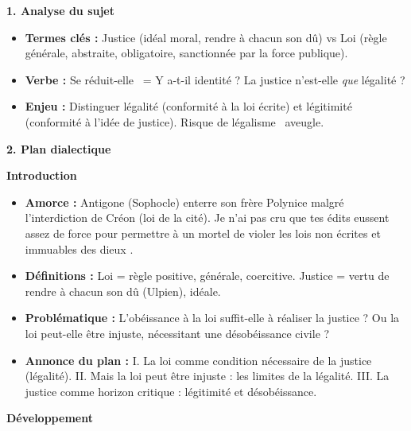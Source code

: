 \documentclass[11pt]{article}
\newcommand{\cle}[1]{{\popxbold\color{popdark}#1}}
\begin{document}
\begin{exoresolu}
\textbf{1. Analyse du sujet}
\begin{itemize}
    \item \textbf{Termes clés :} \cle{Justice} (idéal moral, rendre à chacun son dû) vs \cle{Loi} (règle générale, abstraite, obligatoire, sanctionnée par la force publique).
    \item \textbf{Verbe :} \guillemotleft Se réduit-elle \guillemotright\ = Y a-t-il identité ? La justice n'est-elle \emph{que} légalité ?
    \item \textbf{Enjeu :} Distinguer \cle{légalité} (conformité à la loi écrite) et \cle{légitimité} (conformité à l'idée de justice). Risque de \guillemotleft légalisme \guillemotright\ aveugle.
\end{itemize}

\textbf{2. Plan dialectique}

\textbf{Introduction}
\begin{itemize}
    \item \textbf{Amorce :} Antigone (Sophocle) enterre son frère Polynice malgré l'interdiction de Créon (loi de la cité). \guillemotleft Je n'ai pas cru que tes édits eussent assez de force pour permettre à un mortel de violer les lois non écrites et immuables des dieux \guillemotright.
    \item \textbf{Définitions :} Loi = règle positive, générale, coercitive. Justice = vertu de rendre à chacun son dû (Ulpien), idéale.
    \item \textbf{Problématique :} L'obéissance à la loi suffit-elle à réaliser la justice ? Ou la loi peut-elle être injuste, nécessitant une désobéissance civile ?
    \item \textbf{Annonce du plan :} I. La loi comme condition nécessaire de la justice (légalité). II. Mais la loi peut être injuste : les limites de la légalité. III. La justice comme horizon critique : légitimité et désobéissance.
\end{itemize}

\textbf{Développement}


\end{exoresolu}
\end{document}
